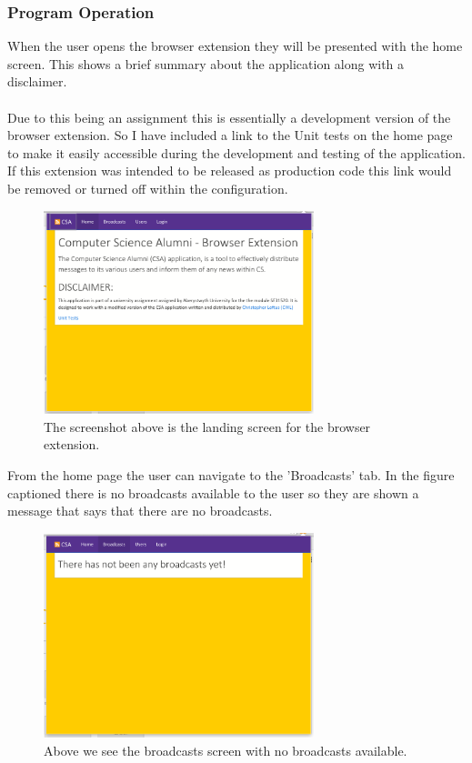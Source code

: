 \documentclass{article}
\begin{document}
\newpage
\subsubsection{Program Operation}

When the user opens the browser extension they will be presented with the home screen. This shows a brief summary about the application along with a disclaimer.\\
\\
Due to this being an assignment this is essentially a development version of the browser extension. So I have included a link to the Unit tests on the home page to make it easily accessible during the development and testing of the application. If this extension was intended to be released as production code this link would be removed or turned off within the configuration.\\

\begin{figure}[H]
\centering
\includegraphics[width=0.7\textwidth]{homepage}
\caption{The screenshot above is the landing screen for the browser extension.}
\end{figure}

\newpage
From the home page the user can navigate to the 'Broadcasts' tab. In the figure captioned there is no broadcasts available to the user so they are shown a message that says that there are no broadcasts.\\

\begin{figure}[H]
\centering
\includegraphics[width=0.7\textwidth]{bcpage}
\caption{Above we see the broadcasts screen with no broadcasts available.}
\end{figure}
\end{document}
